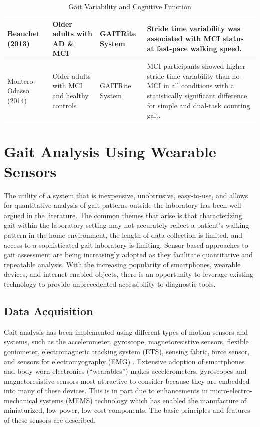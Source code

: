 \documentclass[11pt, oneside]{report}
\begin{document}
\begin{table}[!htb]
\begin{adjustbox}{max width=\textwidth}
\begin{tabular}{| l | p{4cm} | p{4cm} | p{7cm} |}
    Beauchet (2013)\cite{Beauchet2013} & Older adults with AD \& MCI & GAITRite System & Stride time variability was associated with MCI status at fast-pace walking speed. \\ \hline
    
        Montero-Odasso (2014)\cite{Montero-Odasso2014} & Older adults with MCI and healthy controls & GAITRite System & MCI participants showed higher stride time variability than no-MCI in all conditions with a statistically significant difference for simple and dual-task counting gait. \\ \hline

    
  \end{tabular}
\end{adjustbox}
\caption{Gait Variability and Cognitive Function}\label{tab:gait_cog_table}
\end{table}

\pagebreak

\chapter{Gait Analysis Using Wearable Sensors}

The utility of a system that is inexpensive, unobtrusive, easy-to-use, and allows for quantitative analysis of gait patterns outside the laboratory has been well argued in the literature\cite{Tao2012, SantAnna2009, Patel2012, Itoh2008, Malaric2010, Godfrey2015}. The common themes that arise is that characterizing gait within the laboratory setting may not accurately reflect a patient's walking pattern in the home environment, the length of data collection is limited, and access to a sophisticated gait laboratory is limiting. Sensor-based approaches to gait assessment are being increasingly adopted as they facilitate quantitative and repeatable analysis\cite{Khusainov2013}. With the increasing popularity of smartphones, wearable devices, and internet-enabled objects, there is an opportunity to leverage existing technology to provide unprecedented accessibility to diagnostic tools.

\section{Data Acquisition}

Gait analysis has been implemented using different types of motion sensors and systems, such as the accelerometer, gyroscope, magnetoresistive sensors, flexible goniometer, electromagnetic tracking system (ETS), sensing fabric, force sensor, and sensors for electromyography (EMG) \cite{Tao2012}. Extensive adoption of smartphones and body-worn electronics (``wearables'') makes accelerometers, gyroscopes and magnetoresistive sensors most attractive to consider because they are embedded into many of these devices. This is in part due to enhancements in micro-electro-mechanical systems (MEMS) technology which has enabled the manufacture of miniaturized, low power, low cost components\cite{SantAnna2009}. The basic principles and features of these sensors are described.
\end{document}
